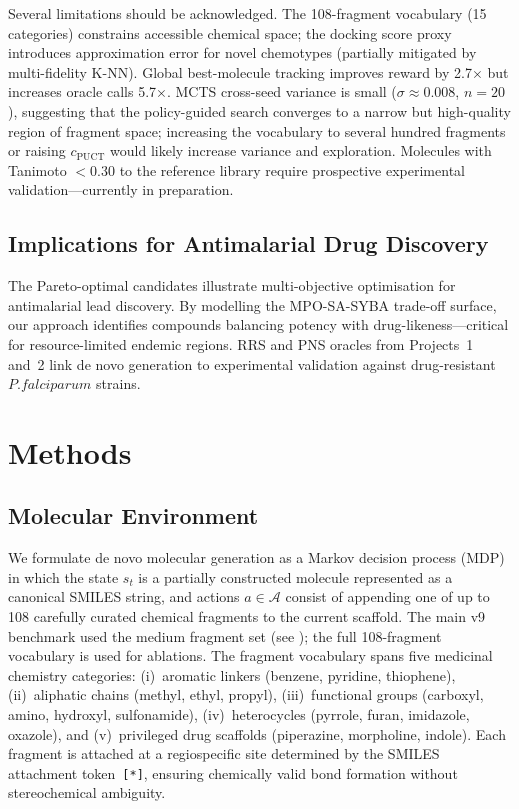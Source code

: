 \documentclass[jcim,article,layout=manuscript]{achemso}
\begin{document}
Several limitations should be acknowledged. The 108-fragment vocabulary (15 categories)
constrains accessible chemical space; the docking score proxy introduces
approximation error for novel chemotypes (partially mitigated by multi-fidelity
K-NN). Global best-molecule tracking improves reward by 2.7$\times$ but increases
oracle calls 5.7$\times$. MCTS cross-seed variance is small ($\sigma \approx 0.008$,
$n=20$), suggesting that the policy-guided search converges to a narrow but
high-quality region of fragment space; increasing the vocabulary to several
hundred fragments or raising $c_{\text{PUCT}}$ would likely increase variance and
exploration. Molecules with Tanimoto $<0.30$ to the reference library require
prospective experimental validation---currently in preparation.

\subsection{Implications for Antimalarial Drug Discovery}

The Pareto-optimal candidates illustrate multi-objective optimisation for
antimalarial lead discovery. By modelling the MPO-SA-SYBA trade-off surface,
our approach identifies compounds balancing potency with drug-likeness---critical
for resource-limited endemic regions. RRS and PNS oracles from Projects~1 and~2
link de novo generation to experimental validation against drug-resistant
$P. falciparum$ strains.

\section{Methods}

\subsection{Molecular Environment}
\label{sec:env}

We formulate de novo molecular generation as a Markov decision process
(MDP) in which the state $s_t$ is a partially constructed molecule
represented as a canonical SMILES string, and actions $a \in \mathcal{A}$
consist of appending one of up to 108 carefully curated chemical fragments to the
current scaffold. The main v9 benchmark used the medium fragment set
(see ); the full 108-fragment vocabulary is used for
ablations. The fragment vocabulary spans five
medicinal chemistry categories: (i)~aromatic linkers (benzene, pyridine,
thiophene), (ii)~aliphatic chains (methyl, ethyl, propyl), (iii)~functional
groups (carboxyl, amino, hydroxyl, sulfonamide), (iv)~heterocycles
(pyrrole, furan, imidazole, oxazole), and (v)~privileged drug scaffolds
(piperazine, morpholine, indole). Each fragment is attached at a
regiospecific site determined by the SMILES attachment token~\texttt{[*]},
ensuring chemically valid bond formation without stereochemical ambiguity.
\end{document}
